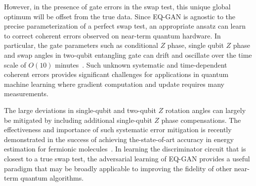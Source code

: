 \documentclass[prl,superscriptaddress,twocolumn]{revtex4}
\theoremstyle{plain}
\theoremstyle{definition}
\begin{document}
However, in the presence of gate errors in the swap test, this unique global optimum will be offset from the true data. Since EQ-GAN is agnostic to the precise parameterization of a perfect swap test, an appropriate ansatz can learn to correct coherent errors observed on near-term quantum hardware. In particular, the gate parameters such as conditional $Z$ phase, single qubit $Z$ phase and swap angles in two-qubit entangling gate can drift and oscillate over the time scale of $O(10)$ minutes~\cite{arute2020supp,arute2020observation}. Such unknown systematic and time-dependent coherent errors provides significant challenges for applications in quantum machine learning where gradient computation and update requires many measurements.


The large deviations in single-qubit and two-qubit $Z$ rotation angles can largely be mitigated by including additional single-qubit $Z$ phase compensations. The effectiveness and importance of such systematic error mitigation is recently demonstrated in the success of achieving the-state-of-art accuracy in energy estimation for fermionic molecules~\cite{HartreeFockScience}. In learning the discriminator circuit that is closest to a true swap test, the adversarial learning of EQ-GAN provides a useful paradigm that may be broadly applicable to improving the fidelity of other near-term quantum algorithms.
\end{document}
